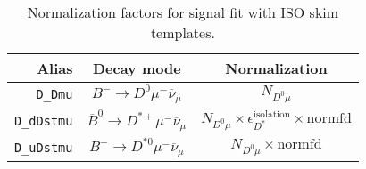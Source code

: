 


\begin{landscape}
\begin{table}
\centering
\caption{
    Normalization factors for \Dz signal fit with ISO skim templates.
}
\label{tab:fit-norm-fact-d0}
\scriptsize

\begin{tabular}{r|c|c}
\toprule
           \textbf{Alias} &                                 \textbf{Decay mode}                                  &                                                                                                                                                                        \textbf{Normalization}                                                                                                                                                                         \\
\midrule
          \texttt{D\_Dmu} &                    $B^- \rightarrow D^0 \mu^- \overline{\nu}_\mu$                    &                                                                                                                                                                             $N_{D^0 \mu}$                                                                                                                                                                             \\
       \texttt{D\_dDstmu} &             $\overline{B}^0 \rightarrow D^{*+} \mu^- \overline{\nu}_\mu$             &                                                                                                                                               $N_{D^0 \mu} \times \epsilon_{D^*}^\text{isolation} \times \text{normfd}$                                                                                                                                               \\
       \texttt{D\_uDstmu} &                  $B^- \rightarrow D^{*0} \mu^- \overline{\nu}_\mu$                   &                                                                                                                                                                  $N_{D^0 \mu} \times \text{normfd}$                                                                                                                                                                   \\

\end{tabular}
\end{table}
\end{landscape}
